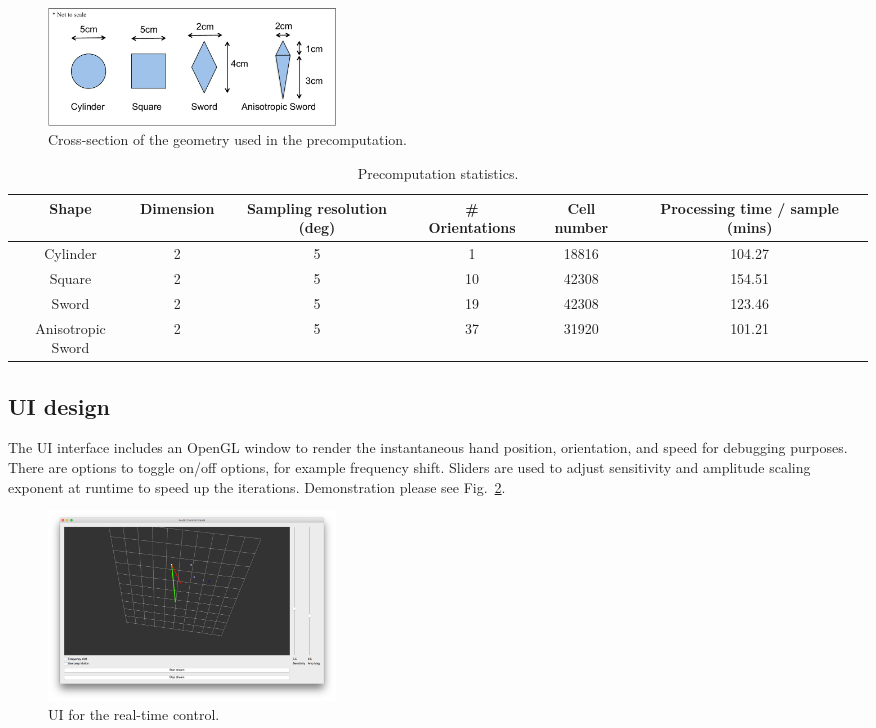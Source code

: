 \documentclass[tog]{acmsiggraph}
\begin{document}
\begin{figure}[ht]
  \centering
  \includegraphics[width=3.0in]{images/simulation_geometry.pdf}
  \caption{Cross-section of the geometry used in the precomputation.}
  \label{fig:simulation_geometry}
\end{figure}

\begin{table}[t]
  \centering
  \caption{Precomputation statistics.}
  \begin{tabular}{*{6}{c}}
    \hline
    \textbf{Shape} & \textbf{Dimension} & \textbf{Sampling resolution (deg)} & \textbf{\# Orientations} & \textbf{Cell number} & \textbf{Processing time / sample (mins)} \\
    \hline
    Cylinder & 2 & 5 & 1 & 18816 & 104.27 \\
    \hline
    Square & 2 & 5 & 10 & 42308 & 154.51 \\
    \hline
    Sword & 2 & 5 & 19 & 42308 & 123.46 \\
    \hline
    Anisotropic Sword & 2 & 5 & 37 & 31920 & 101.21 \\
    \hline
\end{tabular} \label{table:runstats}

\end{table}

\subsection{UI design}
The UI interface includes an OpenGL window to render the instantaneous hand position, orientation, and speed for debugging purposes. There are options to toggle on/off options, for example frequency shift. Sliders are used to adjust sensitivity and amplitude scaling exponent at runtime to speed up the iterations. Demonstration please see Fig.~\ref{fig:UI}.

\begin{figure}[ht]
  \centering
  \includegraphics[width=3.0in]{images/UI.pdf}
  \caption{UI for the real-time control.}
  \label{fig:UI}
\end{figure}
\end{document}
